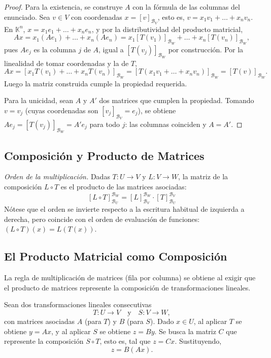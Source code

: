 \documentclass[11pt, a4paper]{article}
\begin{document}
\begin{proof}
Para la existencia, se construye $A$ con la fórmula de las columnas del enunciado. Sea $v \in V$ con coordenadas $x = [v]_{\mathcal{B}_V}$, esto es, $v = x_1 v_1 + \dots + x_n v_n$. En $\mathbb{K}^n$, $x = x_1 e_1 + \dots + x_n e_n$, y por la distributividad del producto matricial,
\[ A x = x_1 (A e_1) + \dots + x_n (A e_n) = x_1 [T(v_1)]_{\mathcal{B}_W} + \dots + x_n [T(v_n)]_{\mathcal{B}_W}, \]
pues $A e_j$ es la columna $j$ de $A$, igual a $[T(v_j)]_{\mathcal{B}_W}$ por construcción. Por la linealidad de tomar coordenadas y la de $T$,
\[ A x = \left[ x_1 T(v_1) + \dots + x_n T(v_n) \right]_{\mathcal{B}_W} = \left[ T( x_1 v_1 + \dots + x_n v_n ) \right]_{\mathcal{B}_W} = [T(v)]_{\mathcal{B}_W}. \]
Luego la matriz construida cumple la propiedad requerida.

Para la unicidad, sean $A$ y $A'$ dos matrices que cumplen la propiedad. Tomando $v = v_j$ (cuyas coordenadas son $[v_j]_{\mathcal{B}_V} = e_j$), se obtiene $A e_j = [T(v_j)]_{\mathcal{B}_W} = A' e_j$ para todo $j$: las columnas coinciden y $A = A'$.
\end{proof}

\subsection{Composición y Producto de Matrices}

\obs \textit{Orden de la multiplicación.} Dadas $T: U \to V$ y $L: V \to W$, la matriz de la composición $L \circ T$ es el producto de las matrices asociadas:
\[ [L \circ T]_{\mathcal{B}_U}^{\mathcal{B}_W} = [L]_{\mathcal{B}_V}^{\mathcal{B}_W} \cdot [T]_{\mathcal{B}_U}^{\mathcal{B}_V} \]
Nótese que el orden se invierte respecto a la escritura habitual de izquierda a derecha, pero coincide con el orden de evaluación de funciones: $(L \circ T)(x) = L(T(x))$.

\subsection{El Producto Matricial como Composición}

La regla de multiplicación de matrices (fila por columna) se obtiene al exigir que el producto de matrices represente la composición de transformaciones lineales.

Sean dos transformaciones lineales consecutivas
\[ T: U \to V \quad \text{y} \quad S: V \to W, \]
con matrices asociadas $A$ (para $T$) y $B$ (para $S$). Dado $x \in U$, al aplicar $T$ se obtiene $y = Ax$, y al aplicar $S$ se obtiene $z = By$. Se busca la matriz $C$ que represente la composición $S \circ T$, esto es, tal que $z = Cx$. Sustituyendo,
\[ z = B(Ax). \]
\end{document}
